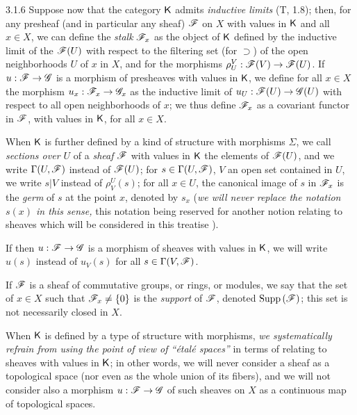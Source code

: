 \begin{env}{3.1.6}
\label{env-0.3.1.6}
Suppose now that the category $\mathsf{K}$ admits \emph{inductive limits} (T, 1.8); then, for any
presheaf (and in particular any sheaf) $\mathscr{F}$ on $X$ with values in $\mathsf{K}$ and all $x\in X$,
we can define the \emph{stalk} $\mathscr{F}_x$ as the object of $\mathsf{K}$ defined by the inductive
limit of the $\mathscr{F}(U)$ with respect to the filtering set (for $\supset$) of the open
neighborhoods $U$ of $x$ in $X$, and for the morphisms $\rho_U^V:\mathscr{F}(V)\to\mathscr{F}(U)$. If
$u:\mathscr{F}\to\mathscr{G}$ is a morphism of presheaves with values in $\mathsf{K}$, we define for all
$x\in X$ the morphism $u_x:\mathscr{F}_x\to\mathscr{G}_x$ as the inductive limit of
$u_U:\mathscr{F}(U)\to\mathscr{G}(U)$ with respect to all open neighborhoods of $x$; we thus define
$\mathscr{F}_x$ as a covariant functor in $\mathscr{F}$, with values in $\mathsf{K}$, for all $x\in X$.

When $\mathsf{K}$ is further defined by a kind of structure with morphisms $\Sigma$, we call
\emph{sections over $U$} of a \emph{sheaf} $\mathscr{F}$ with values in $\mathsf{K}$ the elements of
$\mathscr{F}(U)$, and we write $\Gamma(U,\mathscr{F})$ instead of $\mathscr{F}(U)$; for
$s\in\Gamma(U,\mathscr{F})$, $V$ an open set contained in $U$, we write $s|V$ instead of
$\rho_V^U(s)$; for all $x\in U$, the canonical image of $s$ in $\mathscr{F}_x$ is the \emph{germ}
of $s$ at the point $x$, denoted by $s_x$ (\emph{we will never replace the notation $s(x)$ in
this sense,} this notation being reserved for another notion relating to sheaves which will
be considered in this treatise ).

If then $u:\mathscr{F}\to\mathscr{G}$ is a morphism of sheaves with values in $\mathsf{K}$, we will write
$u(s)$ instead of $u_V(s)$ for all $s\in\Gamma(V,\mathscr{F})$.

If $\mathscr{F}$ is a sheaf of commutative groups, or rings, or modules, we say that the set of
$x\in X$ such that $\mathscr{F}_x\neq\{0\}$ is the \emph{support} of $\mathscr{F}$, denoted
${\mathop{\mathrm{Supp}}\nolimits}\,(\mathscr{F})$; this set is not necessarily closed in $X$.

When $\mathsf{K}$ is defined by a type of structure with morphisms, \emph{we systematically refrain
from using the point of view of ``\'etal\'e spaces''} in terms of relating to sheaves with
values in $\mathsf{K}$; in other words, we will never consider a sheaf as a topological space (nor
even as the whole union of its fibers), and we will not consider also a morphism
$u:\mathscr{F}\to\mathscr{G}$ of such sheaves on $X$ as a continuous map of topological spaces.
\end{env}

